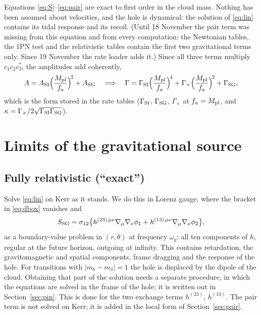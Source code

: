 \documentclass[11pt]{article}
\newcommand{\Mpl}{M_{\rm pl}}
\begin{document}
Equations \eqref{eq:S}--\eqref{eq:pair} are exact to first order in the cloud mass. Nothing has been assumed about velocities, and the hole is
dynamical: the solution of \eqref{eq:lin} contains its tidal response and its recoil.
(Until 18 November the pair term was missing from this equation and from every computation: the Newtonian tables, the 1PN test and the
relativistic tables contain the first two gravitational terms only. Since 19 November the rate loader adds it.)
Since all three terms multiply $c_1c_2c_3^*$, the amplitudes add coherently,
\begin{equation}
A=A_{\rm SI}\Big(\frac{\Mpl}{f_a}\Big)^{\!2}+A_{\rm SG}\quad\Longrightarrow\quad
\Gamma=\Gamma_{\rm SI}\Big(\frac{\Mpl}{f_a}\Big)^{\!4}+\Gamma_{\times}\Big(\frac{\Mpl}{f_a}\Big)^{\!2}+\Gamma_{\rm SG},
\end{equation}
which is the form stored in the rate tables ($\Gamma_{\rm SI}$, $\Gamma_{\rm SG}$, $\Gamma_\times$ at $f_a=\Mpl$, and $\kappa=\Gamma_\times/2\sqrt{\Gamma_{\rm SI}\Gamma_{\rm SG}}$).

\section{Limits of the gravitational source}

\subsection{Fully relativistic (``exact'')}
Solve \eqref{eq:lin} on Kerr as it stands. We do this in Lorenz gauge, where the bracket in \eqref{eq:dbox} vanishes and
\begin{equation}
S_{\rm SG}=\sigma_{12}\big\{h^{(23)\,\mu\nu}\nabla_\mu\nabla_\nu\phi_1+h^{(13)\,\mu\nu}\nabla_\mu\nabla_\nu\phi_2\big\},
\end{equation}
as a boundary-value problem in $(r,\theta)$ at frequency $\omega_g$: all ten components of $h$, regular at the future horizon, outgoing at infinity.
This contains retardation, the gravitomagnetic and spatial components, frame dragging and the response of the hole.
For transitions with $|m_b-m_3|=1$ the hole is displaced by the dipole of the cloud. Obtaining that part of the solution needs a
separate procedure, in which the equations are solved in the frame of the hole; it is written out in Section~\ref{sec:pin}.
This is done for the two exchange terms $h^{(23)}$, $h^{(13)}$. The pair term is not solved on Kerr; it is added in the local form of
Section~\ref{sec:pair}.
\end{document}
